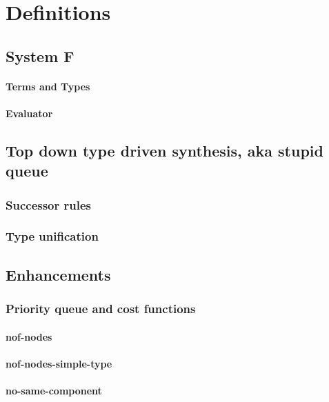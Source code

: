 \chapter{Definitions} \label{definitions}

\section{System F}
  \subsubsection{Terms and Types}
  \subsubsection{Evaluator}

\section{Top down type driven synthesis, aka stupid queue}
\subsection{Successor rules}
\subsection{Type unification}

\section{Enhancements}
\subsection{Priority queue and cost functions}
  \subsubsection{nof-nodes}
  \subsubsection{nof-nodes-simple-type}
  \subsubsection{no-same-component}

